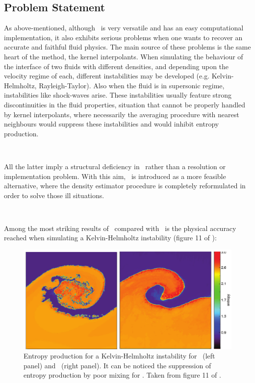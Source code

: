 \documentclass[a4,useAMS,usenatbib,usegraphicx,12pt]{article}
\begin{document}
\subsection*{Problem Statement}

As above-mentioned, although \SPH\ is very versatile and has an easy computational
implementation, it also exhibits serious problems when one wants to recover an 
accurate and faithful fluid physics. The main source of these problems is the 
same heart of the method, the kernel interpolants. When simulating the behaviour
of the interface of two fluids with different densities, and depending upon the 
velocity regime of each, different instabilities may be developed (e.g. 
Kelvin-Helmholtz, Rayleigh-Taylor). Also when the fluid is in supersonic regime,
instabilities like shock-waves arise. These instabilities usually feature strong
discontinuities in the fluid properties, situation that cannot be properly 
handled by kernel interpolants, where necessarily the averaging procedure with 
nearest neighbours would suppress these instabilities and would inhibit entropy
production.

\

All the latter imply a structural deficiency in \SPH\ rather than a resolution
or implementation problem. With this aim, \VPH\ is introduced as a more feasible
alternative, where the density estimator procedure is completely reformulated
in order to solve those ill situations.

\

Among the most striking results of \VPH\ compared with \SPH\ is the physical 
accuracy reached when simulating a Kelvin-Helmholtz instability (figure 11 of 
\citet{Hess10}):

\begin{figure}[h]
\centering

  \includegraphics[trim = 0mm 0mm 0mm 0mm, clip, keepaspectratio=true,
  width=0.6\textheight]{./figures/KH-Insbaility.png}
  
  \caption{\small Entropy production for a Kelvin-Helmholtz instability for
  \VPH\ (left panel) and \SPH\ (right panel). It can be noticed the 
  suppression of entropy production by poor mixing for \SPH. Taken from
  figure 11 of \citet{Hess10}.}

  \label{fig:KHinstability}

\end{figure}
\end{document}
